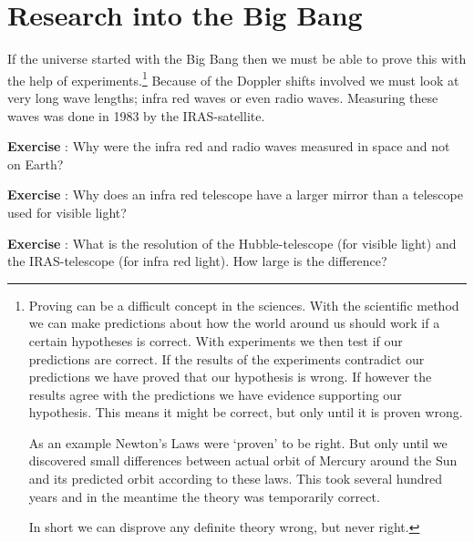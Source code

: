 \section{Research into the Big Bang}
If the universe started with the Big Bang then we must be able to prove this with the help of experiments.\footnote{Proving can be a difficult concept in the sciences. With the scientific method we can make predictions about how the world around us should work if a certain hypotheses is correct. With experiments we then test if our predictions are correct. If the results of the experiments contradict our predictions we have proved that our hypothesis is wrong. If however the results agree with the predictions we have evidence supporting our hypothesis. This means it might be correct, but only until it is proven wrong.

As an example Newton's Laws were `proven' to be right. But only until we discovered small differences between actual orbit of Mercury around the Sun and its predicted orbit according to these laws. This took several hundred years and in the meantime the theory was temporarily correct.

In short we can disprove any definite theory wrong, but never right.} Because of the Doppler shifts involved we must look at very long wave lengths; infra red waves or even radio waves. Measuring these waves was done in 1983 by the IRAS-satellite. 

\begin{shaded}
\textbf{Exercise \theExercise {}} : Why were the infra red and radio waves measured in space and not on Earth?\end{shaded}
\begin{shaded}
\textbf{Exercise \theExercise {}} : Why does an infra red telescope have a larger mirror than a telescope used for visible light?\end{shaded}
\begin{shaded}
\textbf{Exercise \theExercise {}} : What is the resolution of the Hubble-telescope (for visible light) and the IRAS-telescope (for infra red light). How large is the difference?\end{shaded}


